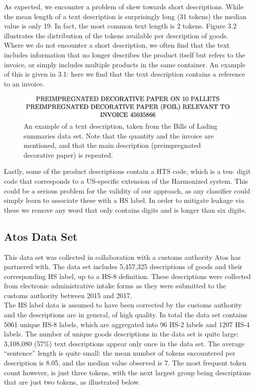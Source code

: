As expected, we encounter a problem of skew towards short descriptions. While the mean length of a text description is surprisingly long (31 tokens) the median value is only 19. In fact, the most common text length is 2 tokens. Figure 3.2 illustrates the distribution of the tokens available per description of goods.\\
Where we do not encounter a short description, we often find that the text includes information that no longer describes the product itself but refers to the invoice, or simply includes multiple products in the same container. An example of this is given in 3.1: here we find that the text description contains a reference to an invoice.

\begin{figure}[h]
    \centering
    \includegraphics[width=1\textwidth]{bol1.png}
    \caption{An example of a text description, taken from the Bills of Lading summaries data set. Note that the quantity and the invoice are mentioned, and that the main description (preimpregnated decorative paper) is repeated.}
    \label{fig:eg BOL}
\end{figure}

Lastly, some of the product descriptions contain a HTS code, which is a ten- digit code that corresponds to a US-specific extension of the Harmonized system. This could be a serious problem for the validity of our approach, as any classifier could simply learn to associate these with a HS label. In order to mitigate leakage via these we remove any word that only contains digits and is longer than six digits.

\subsection{Atos Data Set}
This data set was collected in collaboration with a customs authority Atos has partnered with. The data set includes 5,457,325 descriptions of goods and their corresponding HS label, up to a HS-8 definition. These descriptions were collected from electronic administrative intake forms as they were submitted to the customs authority between 2015 and 2017. \\
The HS label data is assumed to have been corrected by the customs authority and the descriptions are in general, of high quality. In total the data set contains 5061 unique HS-8 labels, which are aggregated into 96 HS-2 labels and 1207 HS-4 labels. The number of unique goods descriptions in the data set is quite large: 3,108,080 (57{\%}) text descriptions appear only once in the data set. The average “sentence” length is quite small: the mean number of tokens encountered per description is 8.05, and the median value observed is 7. The most frequent token count however, is just three tokens, with the next largest group being descriptions that are just two tokens, as illustrated below.

